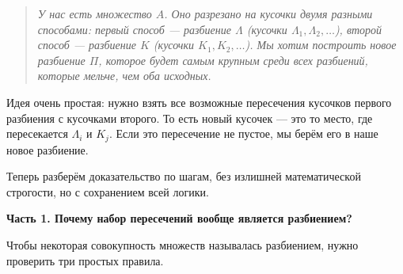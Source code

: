 \documentclass[a4paper,12pt]{article}
\begin{document}
\begin{quote}
	\textit{У нас есть множество $A$. Оно разрезано на кусочки двумя разными способами: первый способ — разбиение $\Lambda$ (кусочки $\Lambda_1, \Lambda_2, \dots$), второй способ — разбиение $K$ (кусочки $K_1, K_2, \dots$). Мы хотим построить новое разбиение $\Pi$, которое будет самым крупным среди всех разбиений, которые мельче, чем оба исходных.}
\end{quote}

Идея очень простая: нужно взять все возможные пересечения кусочков первого разбиения с кусочками второго. То есть новый кусочек — это то место, где пересекается $\Lambda_i$ и $K_j$. Если это пересечение не пустое, мы берём его в наше новое разбиение.

Теперь разберём доказательство по шагам, без излишней математической строгости, но с сохранением всей логики.

\vspace{0.4cm}
\noindent \textbf{Часть 1. Почему набор пересечений вообще является разбиением?}

Чтобы некоторая совокупность множеств называлась разбиением, нужно проверить три простых правила.
\end{document}
